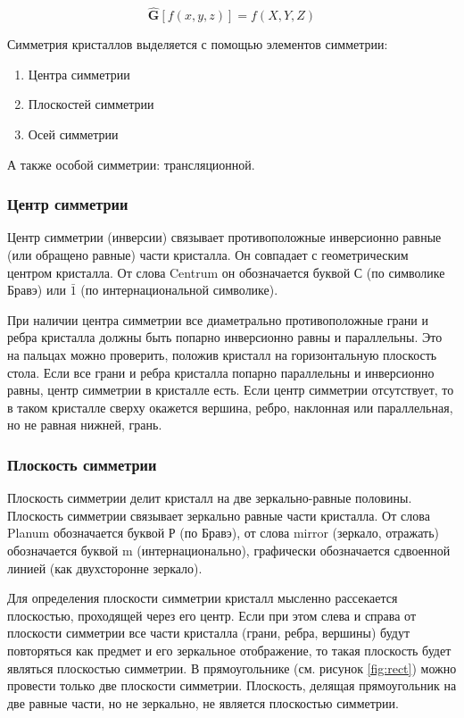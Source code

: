\documentclass[a4paper, 12pt]{article}
\begin{document}
\begin{equation}
	\hat{\mathbf{G}} [f(x, y, z)] = f(X, Y, Z)
\end{equation}

Симметрия кристаллов выделяется с помощью элементов симметрии:

\begin{enumerate}
	\item Центра симметрии
	
	\item Плоскостей симметрии
	
	\item Осей симметрии
\end{enumerate}

А также особой симметрии: трансляционной.

\subsubsection*{Центр симметрии}

Центр симметрии (инверсии) связывает противоположные инверсионно равные (или обращено равные) части кристалла. Он совпадает с геометрическим центром кристалла. От слова Centrum он обозначается буквой С (по символике Бравэ) или $\bar{1}$ (по интернациональной символике).

При наличии центра симметрии все диаметрально противоположные грани и ребра кристалла должны быть попарно инверсионно равны и параллельны. Это на пальцах можно проверить, положив кристалл на горизонтальную плоскость стола. Если все грани и ребра кристалла попарно параллельны и инверсионно равны, центр симметрии в кристалле есть. Если центр симметрии отсутствует, то в таком кристалле сверху окажется вершина, ребро, наклонная или параллельная, но не равная нижней, грань.

\subsubsection*{Плоскость симметрии}

Плоскость симметрии делит кристалл на две зеркально-равные половины. Плоскость симметрии связывает зеркально равные части кристалла. От слова Planum обозначается буквой Р (по Бравэ), от слова mirror (зеркало, отражать) обозначается буквой m (интернационально), графически обозначается сдвоенной линией (как двухсторонне зеркало).

Для определения плоскости симметрии кристалл мысленно рассекается плоскостью, проходящей через его центр. Если при этом слева и справа от плоскости симметрии все части кристалла (грани, ребра, вершины) будут повторяться как предмет и его зеркальное отображение, то такая плоскость будет являться плоскостью симметрии.
В прямоугольнике (см. рисунок \ref{fig:rect}) можно провести только две плоскости симметрии. Плоскость, делящая прямоугольник на две равные части, но не зеркально, не является плоскостью симметрии.
\end{document}
